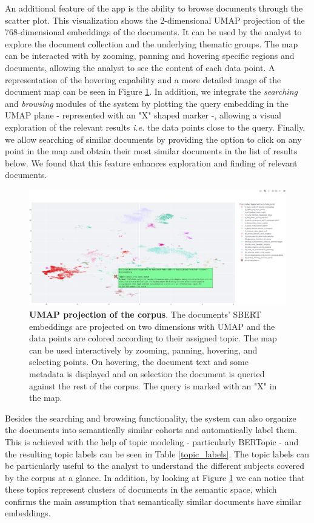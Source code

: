 \documentclass[a4paper]{article}
\begin{document}
An additional feature of the app is the ability to browse documents through the scatter plot. This visualization shows the 2-dimensional UMAP projection of the 768-dimensional embeddings of the documents. It can be used by the analyst to explore the document collection and the underlying thematic groups. The map can be interacted with by zooming, panning and hovering specific regions and documents, allowing the analyst to see the content of each data point. A representation of the hovering capability and a more detailed image of the document map can be seen in Figure \ref{app_map}. In addition, we integrate the \emph{searching} and \emph{browsing} modules of the system by plotting the query embedding in the UMAP plane - represented with an "X" shaped marker -, allowing a visual exploration of the relevant results \emph{i.e.} the data points close to the query. Finally, we allow searching of similar documents by providing the option to click on any point in the map and obtain their most similar documents in the list of results below. We found that this feature enhances exploration and finding of relevant documents.

\begin{figure}[H]
	\centering
	\includegraphics[scale=0.325]{./assets/map_screenshot}
	\caption{\textbf{UMAP projection of the corpus}. The documents' SBERT embeddings are projected on two dimensions with UMAP and the data points are colored according to their assigned topic. The map can be used interactively by zooming, panning, hovering, and selecting points. On hovering, the document text and some metadata is displayed and on selection the document is queried against the rest of the corpus. The query is marked with an "X" in the map.}
	\label{app_map}
\end{figure}

Besides the searching and browsing functionality, the system can also organize the documents into semantically similar cohorts and automatically label them. This is achieved with the help of topic modeling - particularly BERTopic - and the resulting topic labels can be seen in Table \ref{topic_labels}. The topic labels can be particularly useful to the analyst to understand the different subjects covered by the corpus at a glance. In addition, by looking at Figure \ref{app_map} we can notice that these topics represent clusters of documents in the semantic space, which confirms the main assumption that semantically similar documents have similar embeddings.
\end{document}
